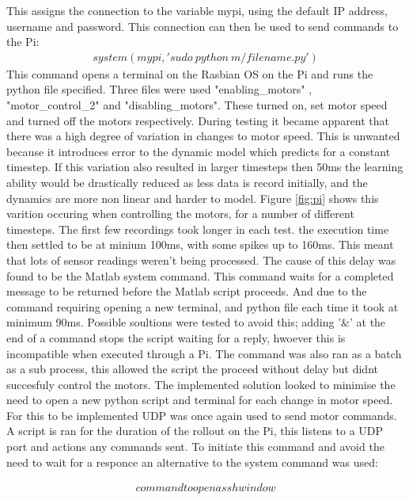 \documentclass[twoside,twocolumn,12pt]{article}
\begin{document}
This assigns the connection to the variable mypi, using the default IP address, username and password. This connection can then be used to send commands to the Pi:
\begin{gather}
system(mypi, 'sudo \: python \: m/filename.py')
\end{gather}
This command opens a terminal on the Rasbian OS on the Pi and runs the python file specified. Three files were used \cite{motor} "enabling\_motors" , "motor\_control\_2" and "disabling\_motors". These turned on, set motor speed and turned off the motors respectively.
\newline
During testing it became apparent that there was a high degree of variation in changes to motor speed. This is unwanted because it introduces error to the dynamic model which predicts for a constant timestep. If this variation also resulted in larger timesteps then 50ms the learning ability would be drastically reduced as less data is record initially, and the dynamics are more non linear and harder to model. Figure \ref{fig:pi} shows this varition occuring when controlling the motors, for a number of different timesteps. The first few recordings took longer in each test. the execution time then settled to be at minium 100ms, with some spikes up to 160ms. This meant that lots of sensor readings weren't being processed.
\newline
The cause of this delay was found to be the Matlab system command. This command waits for a completed message to be returned before the Matlab script proceeds. And due to the command requiring opening a new terminal, and python file each time it took at minimum 90ms. Possible soultions were tested to avoid this; adding '\&' at the end of a command stops the script waiting for a reply, hwoever this is incompatible when executed through a Pi. The command was also ran as a batch as a sub process, this allowed the script the proceed without delay but didnt succesfuly control the motors. 
\newline
The implemented solution looked to minimise the need to open a new python script and terminal for each change in motor speed. For this to be implemented UDP was once again used to send motor commands. A script is ran for the duration of the rollout on the Pi, this listens to a UDP port and actions any commands sent. To initiate this command and avoid the need to wait for a responce an alternative to the system command was used:

\begin{gather}
command to open a ssh window
\end{gather}
\end{document}
